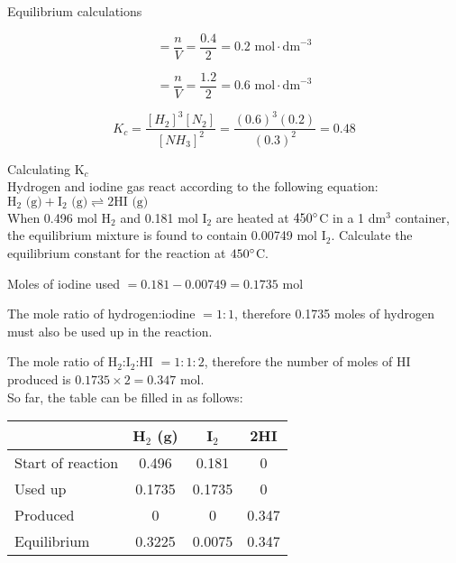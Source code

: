\begin{wex}{Equilibrium calculations}
{\begin{equation*}
[N_{2}] = \frac{n}{V} = \frac{0.4}{2} = 0.2 \text{ mol} \cdot \text{dm}^{-3}
\end{equation*}

\begin{equation*}
[H_{2}] = \frac{n}{V} = \frac{1.2}{2} = 0.6 \text{ mol} \cdot \text{dm}^{-3}
\end{equation*}

\begin{equation*}
K_{c} = \frac{[H_{2}]^{3}[N_{2}]}{[NH_{3}]^{2}} = \frac{(0.6)^{3}(0.2)}{(0.3)^{2}} = 0.48
\end{equation*}
}
\end{wex}

\begin{wex}{Calculating K$_{c}$\\}{
Hydrogen and iodine gas react according to the following equation:\\

$\text{H}_{2}\text{ (g)} + \text{I}_{2}\text{ (g)} \rightleftharpoons 2\text{HI (g)}$\\

When 0.496 mol H$_{2}$ and 0.181 mol I$_{2}$ are heated at $450 ^{\circ}$C in a 1 dm$^{3}$ container, the equilibrium mixture is found to contain 0.00749 mol I$_{2}$. Calculate the equilibrium constant for the reaction at $450 ^{\circ} $C. \\}

{

Moles of iodine used $= 0.181 - 0.00749 = 0.1735$ mol\\
}

{

The mole ratio of hydrogen:iodine $= 1:1$, therefore 0.1735 moles of hydrogen must also be used up in the reaction.\\

The mole ratio of H$_{2}$:I$_{2}$:HI $= 1:1:2$, therefore the number of moles of HI produced is $0.1735 \times 2 = 0.347$ mol.\\

So far, the table can be filled in as follows:
 
\begin{center}
\begin{tabular}{|l|c|c|c|}\hline
 & \textbf{H$_{2}$ (g)} & \textbf{I$_{2}$} & \textbf{2HI}\\\hline
Start of reaction & 0.496 & 0.181 & 0 \\\hline
Used up & 0.1735 & 0.1735 & 0\\\hline
Produced & 0 & 0 & 0.347 \\\hline
Equilibrium & 0.3225 & 0.0075 & 0.347  \\\hline
\end{tabular}
\end{center}

}
\end{wex}
